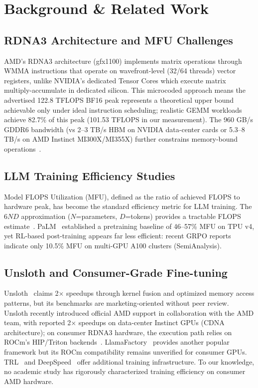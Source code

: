 \section{Background \& Related Work}
\label{sec:background}

\subsection{RDNA3 Architecture and MFU Challenges}

AMD's RDNA3 architecture (gfx1100) implements matrix operations through WMMA instructions that operate on wavefront-level (32/64 threads) vector registers, unlike NVIDIA's dedicated Tensor Cores which execute matrix multiply-accumulate in dedicated silicon. This microcoded approach means the advertised 122.8 TFLOPS BF16 peak represents a theoretical upper bound achievable only under ideal instruction scheduling; realistic GEMM workloads achieve 82.7\% of this peak (101.53 TFLOPS in our measurement). The 960 GB/s GDDR6 bandwidth (vs 2--3 TB/s HBM on NVIDIA data-center cards or 5.3--8 TB/s on AMD Instinct MI300X/MI355X) further constrains memory-bound operations~\citep{amd2022rdna3}.

\subsection{LLM Training Efficiency Studies}

Model FLOPS Utilization (MFU), defined as the ratio of achieved FLOPS to hardware peak, has become the standard efficiency metric for LLM training. The $6ND$ approximation ($N$=parameters, $D$=tokens) provides a tractable FLOPS estimate~\citep{kaplan2020scaling, hoffmann2022chinchilla}. PaLM~\citep{chowdhery2022palm} established a pretraining baseline of 46--57\% MFU on TPU v4, yet RL-based post-training appears far less efficient: recent GRPO reports indicate only 10.5\% MFU on multi-GPU A100 clusters (SemiAnalysis).

\subsection{Unsloth and Consumer-Grade Fine-tuning}

Unsloth~\citep{unsloth2024} claims 2$\times$ speedups through kernel fusion and optimized memory access patterns, but its benchmarks are marketing-oriented without peer review. Unsloth recently introduced official AMD support in collaboration with the AMD team, with reported 2$\times$ speedups on data-center Instinct GPUs (CDNA architecture); on consumer RDNA3 hardware, the execution path relies on ROCm's HIP/Triton backends~\citep{rocm2024}. LlamaFactory~\citep{zheng2024llamafactory} provides another popular framework but its ROCm compatibility remains unverified for consumer GPUs. TRL~\citep{vonwerra2022trl} and DeepSpeed~\citep{rasley2020deepspeed} offer additional training infrastructure. To our knowledge, no academic study has rigorously characterized training efficiency on consumer AMD hardware.
